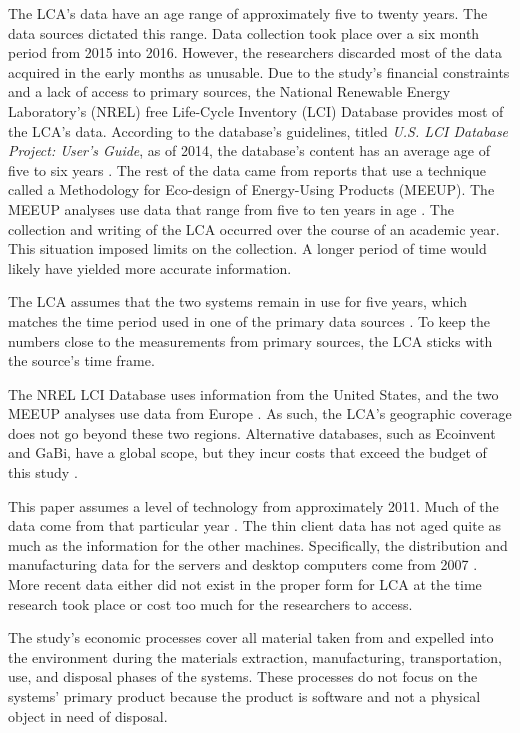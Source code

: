 \documentclass[final,journal,10pt,letterpaper,oneside,twocolumn,compsoc]%
{IEEEtran}
\begin{document}
The LCA's data have an age range of approximately five to twenty years. The
data sources dictated this range. Data
collection took place over a six month period from 2015 into 2016. However, the
researchers discarded
most of the data acquired in the early months as unusable. Due to the study's
financial constraints and a
lack of access to primary sources, the National Renewable Energy Laboratory's
(NREL) free Life-Cycle Inventory (LCI) Database provides most of the LCA's
data. According to the database's guidelines, titled \textit{U.S. LCI Database
Project: User's Guide}, as of 2014, the database's content has an average age
of five to six years
\cite{database}. The rest of the data came from reports that use a technique
called a Methodology for Eco-design of Energy-Using Products (MEEUP). The MEEUP
analyses use data that
range from five to ten years in age \cite{client} \cite{desktop}. The collection
and writing
of the LCA occurred over the course of an academic year. This situation
imposed limits on the collection. A longer period of time would likely have
yielded more accurate information.

The LCA assumes that the two systems remain in use for five years, which
matches the time period used in one of the primary data sources \cite{client}.
To keep the numbers close to the measurements from primary sources, the LCA
sticks with the source's time frame.

The NREL LCI Database uses information from the United States, and
the two MEEUP analyses use data from Europe \cite{database} \cite{client}
\cite{desktop}. As
such, the LCA's geographic coverage does not go beyond these two regions.
Alternative databases, such as Ecoinvent and GaBi, have a global scope, but they
incur costs that exceed the budget of this study \cite{textbook}.

This paper assumes a level of technology from approximately 2011. Much of the
data come
from that particular year \cite{client}. The thin client data has not aged quite
as much as
the information for the other machines. Specifically, the distribution and
manufacturing data for the
servers and desktop computers come from 2007 \cite{desktop}. More recent data
either did not exist in the proper form for LCA at the time research took place
or cost too much for the researchers to access.

The study's economic processes cover all material taken from and expelled into
the environment during the materials extraction, manufacturing, transportation,
use, and disposal phases of the systems. These
processes do not focus on the systems' primary product because the product is
software and not a physical object in need of disposal.
\end{document}

